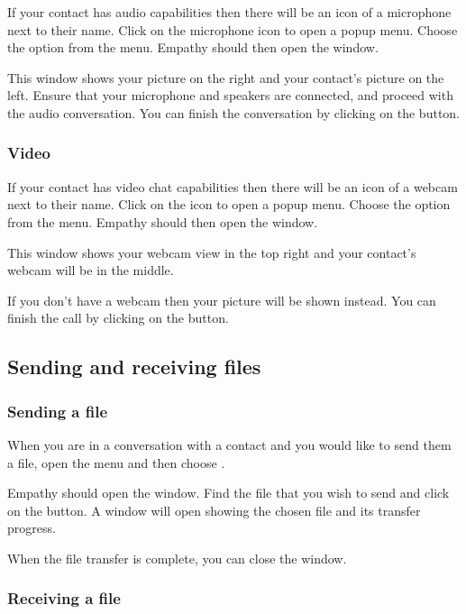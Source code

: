 If your contact has audio capabilities then there will be an icon of a microphone
next to their name. Click on the microphone icon to open a popup menu. Choose the 
 option from the menu. Empathy should then open the 
 window.

This window shows your picture on the right and your contact's picture on the left.
Ensure that your microphone and speakers are connected, and proceed with the 
audio conversation. You can finish the conversation by clicking on the 
 button.

\subsubsection{Video}

If your contact has video chat capabilities then there will be an icon of a webcam
next to their name. Click on the icon to open a popup menu. Choose the 
 option from the menu. Empathy should then open the
 window. 

This window shows your webcam view in the top right and your contact's webcam 
will be in the middle.

If you don't have a webcam then your picture will be shown instead. You can finish 
the call by clicking on the  button.  

\subsection{Sending and receiving files}

\subsubsection{Sending a file}

When you are in a conversation with a contact and you would like to send them a 
file, open the  menu and then choose . 

Empathy should open the  window. Find the file that 
you wish to send and click on the  button. A  
window will open showing the chosen file and its transfer progress. 

When the file transfer is complete, you can close the 
 window.

\subsubsection{Receiving a file}

